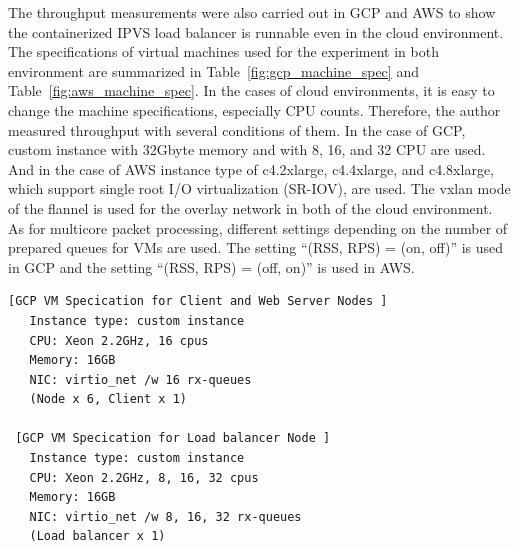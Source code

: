 The throughput measurements were also carried out in GCP and AWS to show the containerized IPVS load balancer is runnable even in the cloud environment.
The specifications of virtual machines used for the experiment in both environment are summarized in Table~\ref{fig:gcp_machine_spec} and Table~\ref{fig:aws_machine_spec}.
In the cases of cloud environments, it is easy to change the machine specifications, especially CPU counts.
Therefore, the author measured throughput with several conditions of them.
In the case of GCP, custom instance with 32Gbyte memory and with 8, 16, and 32 CPU are used.
And in the case of AWS instance type of c4.2xlarge, c4.4xlarge, and c4.8xlarge, which support single root I/O virtualization (SR-IOV), are used.
The vxlan mode of the flannel is used for the overlay network in both of the cloud environment.
As for multicore packet processing, different settings depending on the number of prepared queues for VMs are used. 
The setting \enquote{(RSS, RPS) = (on, off)} is used in GCP and the setting \enquote{(RSS, RPS) = (off, on)} is used in AWS.

\begin{table}[h]

  \centering
  \begin{minipage}{0.9\columnwidth}
    \begin{lstlisting}[frame=lines,breaklines=true,basicstyle=\small\ttfamily]
 [GCP VM Specication for Client and Web Server Nodes ]
   Instance type: custom instance
   CPU: Xeon 2.2GHz, 16 cpus
   Memory: 16GB
   NIC: virtio_net /w 16 rx-queues
   (Node x 6, Client x 1)

 [GCP VM Specication for Load balancer Node ]
   Instance type: custom instance
   CPU: Xeon 2.2GHz, 8, 16, 32 cpus
   Memory: 16GB
   NIC: virtio_net /w 8, 16, 32 rx-queues
   (Load balancer x 1)
    \end{lstlisting}
  \end{minipage}

  \par\bigskip
  \centering
  \begin{minipage}{0.9\columnwidth}
    \caption[Virtual Machine specifications in GCP experiment]{
Virtual Machine specifications in GCP experiment.
The author measured throughputs using load balancer nodes with 8 CPUs, 16 CPUs, and 32 cups.
The number of rx-queues of each node was 8, 16 and 32, respectively.
Since the same number of rx-queues as the number CPU is prepared, the setting with \enquote{(rss, rps) = (on, off)} is used.
    }
    \label{fig:gcp_machine_spec}
  \end{minipage}
\end{table}

